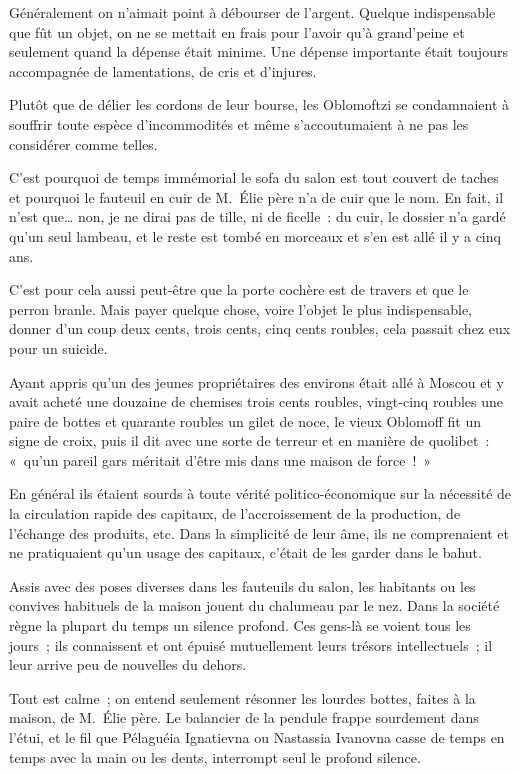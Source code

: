 \documentclass[french,twoside]{book} %
\begin{document}
Généralement on n’aimait point à débourser de l’argent. Quelque indispensable que fût un objet, on ne se mettait en frais pour l’avoir qu’à grand’peine et seulement quand la dépense était minime. Une dépense importante était toujours accompagnée de lamentations, de cris et d’injures.\par
Plutôt que de délier les cordons de leur bourse, les Oblomoftzi se condamnaient à souffrir toute espèce d’incommodités et même s’accoutumaient à ne pas les considérer comme telles.\par
C’est pourquoi de temps immémorial le sofa du salon est tout couvert de taches et pourquoi le fauteuil en cuir de M. Élie père n’a de cuir que le nom. En fait, il n’est que… non, je ne dirai pas de tille, ni de ficelle : du cuir, le dossier n’a gardé qu’un seul lambeau, et le reste est tombé en morceaux et s’en est allé il y a cinq ans.\par
C’est pour cela aussi peut-être que la porte cochère est de travers et que le perron branle. Mais payer quelque chose, voire l’objet le plus indispensable, donner d’un coup deux cents, trois cents, cinq cents roubles, cela passait chez eux pour un suicide.\par
Ayant appris qu’un des jeunes propriétaires des environs était allé à Moscou et y avait acheté une douzaine de chemises trois cents roubles, vingt-cinq roubles une paire de bottes et quarante roubles un gilet de noce, le vieux Oblomoff fit un signe de croix, puis il dit avec une sorte de terreur et en manière de quolibet : « qu’un pareil gars méritait d’être mis dans une maison de force ! »\par
En général ils étaient sourds à toute vérité politico-économique sur la nécessité de la circulation rapide des capitaux, de l’accroissement de la production, de l’échange des produits, etc. Dans la simplicité de leur âme, ils ne comprenaient et ne pratiquaient qu’un usage des capitaux, c’était de les garder dans le bahut.\par
Assis avec des poses diverses dans les fauteuils du salon, les habitants ou les convives habituels de la maison jouent du chalumeau par le nez. Dans la société règne la plupart du temps un silence profond. Ces gens-là se voient tous les jours ; ils connaissent et ont épuisé mutuellement leurs trésors intellectuels ; il leur arrive peu de nouvelles du dehors.\par
Tout est calme ; on entend seulement résonner les lourdes bottes, faites à la maison, de M. Élie père. Le balancier de la pendule frappe sourdement dans l’étui, et le fil que Pélaguéia Ignatievna ou Nastassia Ivanovna casse de temps en temps avec la main ou les dents, interrompt seul le profond silence.\par
\end{document}
